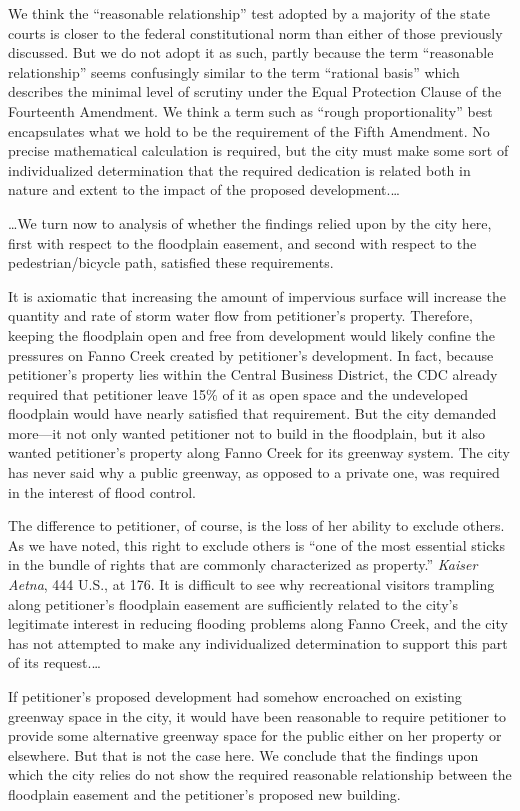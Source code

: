 We think the ``reasonable relationship'' test adopted by a majority of the state
courts is closer to the federal constitutional norm than either of those
previously discussed. But we do not adopt it as such, partly because the term
``reasonable relationship'' seems confusingly similar to the term ``rational
basis'' which describes the minimal level of scrutiny under the Equal Protection
Clause of the Fourteenth Amendment. We think a term such as ``rough
proportionality'' best encapsulates what we hold to be the requirement of the
Fifth Amendment. No precise mathematical calculation is required, but the city
must make some sort of individualized determination that the required dedication
is related both in nature and extent to the impact of the proposed
development.\ldots

\ldots We turn now to analysis of whether the findings relied upon by the city
here, first with respect to the floodplain easement, and second with respect to
the pedestrian/bicycle path, satisfied these requirements.

It is axiomatic that increasing the amount of impervious surface will increase
the quantity and rate of storm water flow from petitioner's property. Therefore,
keeping the floodplain open and free from development would likely confine the
pressures on Fanno Creek created by petitioner's development. In fact, because
petitioner's property lies within the Central Business District, the CDC already
required that petitioner leave 15\% of it as open space and the undeveloped
floodplain would have nearly satisfied that requirement. But the city demanded
more---it not only wanted petitioner not to build in the floodplain, but it also
wanted petitioner's property along Fanno Creek for its greenway system. The city
has never said why a public greenway, as opposed to a private one, was required
in the interest of flood control.

The difference to petitioner, of course, is the loss of her ability to exclude
others. As we have noted, this right to exclude others is ``one of the most
essential sticks in the bundle of rights that are commonly characterized as
property.'' \textit{Kaiser Aetna}, 444 U.S., at 176. It is difficult to see why
recreational visitors trampling along petitioner's floodplain easement are
sufficiently related to the city's legitimate interest in reducing flooding
problems along Fanno Creek, and the city has not attempted to make any
individualized determination to support this part of its request.\ldots

If petitioner's proposed development had somehow encroached on existing greenway
space in the city, it would have been reasonable to require petitioner to
provide some alternative greenway space for the public either on her property or
elsewhere. But that is not the case here. We conclude that the findings upon
which the city relies do not show the required reasonable relationship between
the floodplain easement and the petitioner's proposed new building.

